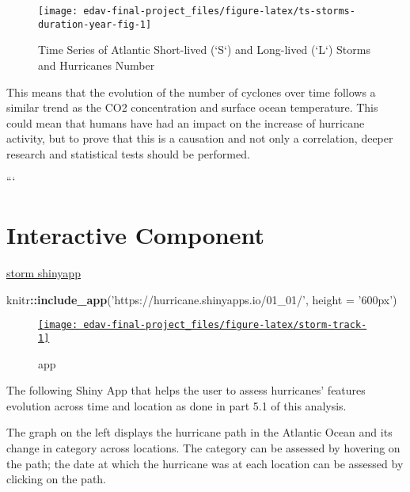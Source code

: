 \documentclass[]{book}
\newenvironment{Shaded}{\begin{snugshade}}{\end{snugshade}}
\newcommand{\DataTypeTok}[1]{\textcolor[rgb]{0.13,0.29,0.53}{#1}}
\newcommand{\KeywordTok}[1]{\textcolor[rgb]{0.13,0.29,0.53}{\textbf{#1}}}
\newcommand{\NormalTok}[1]{#1}
\newcommand{\OperatorTok}[1]{\textcolor[rgb]{0.81,0.36,0.00}{\textbf{#1}}}
\newcommand{\StringTok}[1]{\textcolor[rgb]{0.31,0.60,0.02}{#1}}
\begin{document}
\begin{figure}

{\centering \texttt{[image: edav-final-project\_files/figure-latex/ts-storms-duration-year-fig-1]} 

}

\caption{Time Series of Atlantic Short-lived (`S`) and Long-lived (`L`) Storms and Hurricanes Number}\label{fig:ts-storms-duration-year-fig}
\end{figure}

This means that the evolution of the number of cyclones over time follows a similar trend as the CO2 concentration and surface ocean temperature. This could mean that humans have had an impact on the increase of hurricane activity, but to prove that this is a causation and not only a correlation, deeper research and statistical tests should be performed.

```

\hypertarget{intercom}{%
\chapter{Interactive Component}\label{intercom}}

\href{https://hurricane.shinyapps.io/01_01/}{storm shinyapp}

\begin{Shaded}
\begin{Highlighting}[]
\NormalTok{knitr}\OperatorTok{::}\KeywordTok{include_app}\NormalTok{(}\StringTok{'https://hurricane.shinyapps.io/01_01/'}\NormalTok{, }\DataTypeTok{height =} \StringTok{'600px'}\NormalTok{)}
\end{Highlighting}
\end{Shaded}

\begin{figure}

{\centering \href{https://hurricane.shinyapps.io/01_01/}{\texttt{[image: edav-final-project\_files/figure-latex/storm-track-1]} }

}

\caption{app}\label{fig:storm-track}
\end{figure}

The following Shiny App that helps the user to assess hurricanes' features evolution across time and location as done in part 5.1 of this analysis.

The graph on the left displays the hurricane path in the Atlantic Ocean and its change in category across locations. The category can be assessed by hovering on the path; the date at which the hurricane was at each location can be assessed by clicking on the path.
\end{document}
